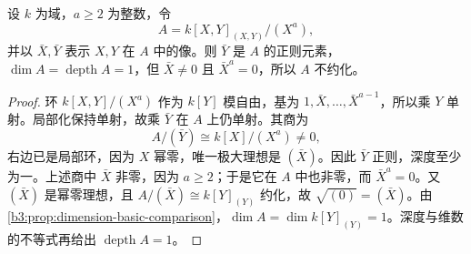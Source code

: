 \begin{proposition}\label{b3:prop:nonreduced-positive-depth}
	设 \(k\) 为域，\(a\ge2\) 为整数，令
	\[
		A=k[X,Y]_{(X,Y)}/(X^a),
	\]
	并以 \(\bar X,\bar Y\) 表示 \(X,Y\) 在 \(A\) 中的像。则 \(\bar Y\) 是 \(A\) 的正则元素，\(\dim A=\operatorname{depth}A=1\)，但 \(\bar X\ne0\) 且 \(\bar X^a=0\)，所以 \(A\) 不约化。
\end{proposition}
\begin{proof}
	环 \(k[X,Y]/(X^a)\) 作为 \(k[Y]\) 模自由，基为 \(1,\bar X,\ldots,\bar X^{a-1}\)，所以乘 \(Y\) 单射。局部化保持单射，故乘 \(\bar Y\) 在 \(A\) 上仍单射。其商为
	\[
		A/(\bar Y)\cong k[X]/(X^a)\ne0,
	\]
	右边已是局部环，因为 \(X\) 幂零，唯一极大理想是 \((\bar X)\)。因此 \(\bar Y\) 正则，深度至少为一。上述商中 \(\bar X\) 非零，因为 \(a\ge2\)；于是它在 \(A\) 中也非零，而 \(\bar X^a=0\)。又 \((\bar X)\) 是幂零理想，且 \(A/(\bar X)\cong k[Y]_{(Y)}\) 约化，故 \(\sqrt{(0)}=(\bar X)\)。由\cref{b3:prop:dimension-basic-comparison}，\(\dim A=\dim k[Y]_{(Y)}=1\)。深度与维数的不等式再给出 \(\operatorname{depth}A=1\)。
\end{proof}
